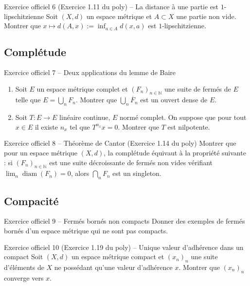 \documentclass[11pt,a4paper]{article}
\newcommand{\N}{\mathbb{N}}
\newcommand{\interieur}[1]{\mathring{#1}}
\newcommand{\diam}{\operatorname{diam}}
\theoremstyle{definition}
\begin{document}
\begin{exo}{Exercice officiel 6 (Exercice 1.11 du poly) -- La distance à une partie est $1$-lipschitzienne}
Soit $(X,d)$ un espace métrique et $A\subset X$ une partie non vide. Montrer que $x\mapsto d(A,x):=\inf_{a\in A}d(x,a)$ est $1$-lipschitzienne.
\end{exo}

\subsection*{Complétude}

\begin{exo}{Exercice officiel 7 -- Deux applications du lemme de Baire}
\begin{enumerate}[label=\arabic*.]
  \item Soit $E$ un espace métrique complet et $(F_n)_{n\in\N}$ une suite de fermés de $E$ telle que $E=\bigcup_{n}F_n$. Montrer que $\bigcup_n\interieur{F_n}$ est un ouvert dense de $E$.
  \item Soit $T:E\to E$ linéaire continue, $E$ normé complet. On suppose que pour tout $x\in E$ il existe $n_x$ tel que $T^{n_x}x=0$. Montrer que $T$ est nilpotente.
\end{enumerate}
\end{exo}

\begin{exo}{Exercice officiel 8 -- Théorème de Cantor (Exercice 1.14 du poly)}
Montrer que pour un espace métrique $(X,d)$, la complétude équivaut à la propriété suivante : si $(F_n)_{n\in\N}$ est une suite décroissante de fermés non vides vérifiant $\lim_n\diam(F_n)=0$, alors $\bigcap_nF_n$ est un singleton.
\end{exo}

\subsection*{Compacité}

\begin{exo}{Exercice officiel 9 -- Fermés bornés non compacts}
Donner des exemples de fermés bornés d'un espace métrique qui ne sont pas compacts.
\end{exo}

\begin{exo}{Exercice officiel 10 (Exercice 1.19 du poly) -- Unique valeur d'adhérence dans un compact}
Soit $(X,d)$ un espace métrique compact et $(x_n)_n$ une suite d'éléments de $X$ ne possédant qu'une valeur d'adhérence $x$. Montrer que $(x_n)_n$ converge vers $x$.
\end{exo}
\end{document}

